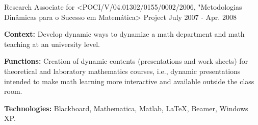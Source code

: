 \begin{cventries}
  \cventry    
    {Research Associate for <POCI/V/04.01302/0155/0002/2006, "Metodologias Din\^amicas para o Sucesso em Matem\'atica> Project} %
    {} %
    {} %
    {July 2007 - Apr. 2008} %
    {
      \begin{cvitems} %
		\item[] {\textbf{Context:} Develop dynamic ways to dynamize a math department and math teaching at an university level.}
		\item[] {\textbf{Functions:} Creation of dynamic contents (presentations and work sheets) for theoretical and laboratory mathematics courses, i.e., dynamic presentations intended to make math learning more interactive and available outside the class room.}
  		\item[] {\textbf{Technologies:} \textcolor{rainbowcolor-olive}{Blackboard}, \textcolor{rainbowcolor-olive}{Mathematica}, \textcolor{rainbowcolor-olive}{Matlab}, \textcolor{rainbowcolor-olive}{LaTeX}, \textcolor{rainbowcolor-olive}{Beamer}, %
  		\textcolor{rainbowcolor-orange}{Windows XP}.}
      \end{cvitems}
    }  
     
\end{cventries}

\vspace{5.0cm}

